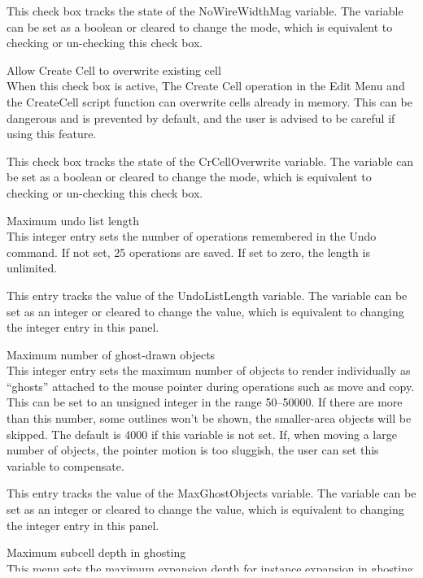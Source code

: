 \begin{description}
This check box tracks the state of the {\et NoWireWidthMag} variable. 
The variable can be set as a boolean or cleared to change the mode,
which is equivalent to checking or un-checking this check box.

\item{\cb Allow Create Cell to overwrite existing cell}\\
When this check box is active, The {\cb Create Cell} operation in the
{\cb Edit Menu} and the {\vt CreateCell} script function can overwrite
cells already in memory.  This can be dangerous and is prevented by
default, and the user is advised to be careful if using this feature.

This check box tracks the state of the {\et CrCellOverwrite} variable. 
The variable can be set as a boolean or cleared to change the mode,
which is equivalent to checking or un-checking this check box.

\item{\cb Maximum undo list length}\\
This integer entry sets the number of operations remembered in the
{\cb Undo} command.  If not set, 25 operations are saved.  If set to
zero, the length is unlimited.

This entry tracks the value of the {\et UndoListLength} variable.  The
variable can be set as an integer or cleared to change the value,
which is equivalent to changing the integer entry in this panel.

\item{\cb Maximum number of ghost-drawn objects}\\
This integer entry sets the maximum number of objects to render
individually as ``ghosts'' attached to the mouse pointer during
operations such as move and copy.  This can be set to an unsigned
integer in the range 50--50000.  If there are more than this number,
some outlines won't be shown, the smaller-area objects will be
skipped.  The default is 4000 if this variable is not set.  If, when
moving a large number of objects, the pointer motion is too sluggish,
the user can set this variable to compensate.

This entry tracks the value of the {\et MaxGhostObjects} variable. 
The variable can be set as an integer or cleared to change the value,
which is equivalent to changing the integer entry in this panel.

\item{\cb Maximum subcell depth in ghosting}\\
This menu sets the maximum expansion depth for instance expansion in
ghosting.  If {\cb as expanded}, this is the same as the normal
expansion depth.  The actual expansion depth used in ghosting will not
be larger than the normal expansion depth, but can be smaller.  For
example, setting this to 0 (zero) will prevent expansion of ghosted
subcells entirely.

This entry tracks the value of the {\et MaxGhostDepth} variable. 
The variable can be set as an integer or cleared to change the value,
which is equivalent to changing the integer entry in this panel.
\end{description}


